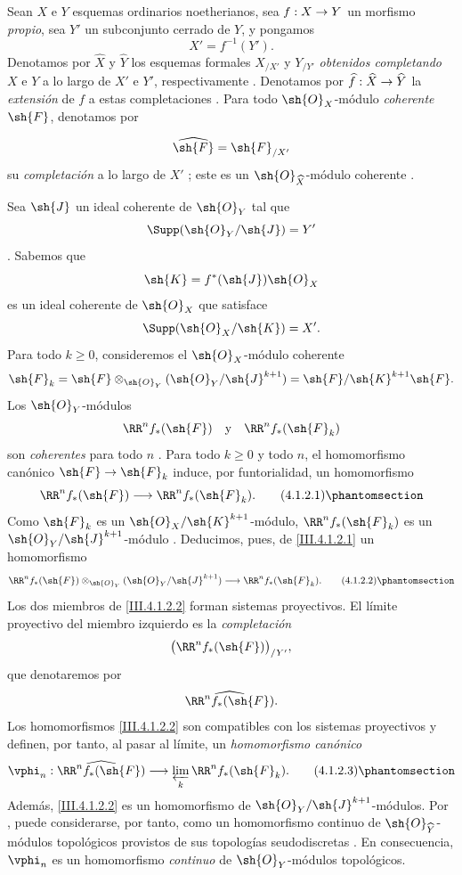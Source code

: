\documentclass[oneside]{amsart}
\makeatletter
\renewcommand{\geq}{\geqslant}
\newcommand{\ega@arrow}[2]{\mathchoice{#1}{#2}{#2}{#2}}
\renewcommand{\to}{\ega@arrow{\longrightarrow}{\rightarrow}}
\newcommand{\oldpage}[2][]{{\marginnote{\normalfont\textbf{#1}~|~#2}}\ignorespaces}
\let\EGAOriginalLabel\label
\renewcommand{\label}[1]{\phantomsection\EGAOriginalLabel{#1}}
\makeatother
\begin{document}
\begin{env}[4.1.1]
\label{III.4.1.1}
Sean $X$ e $Y$ esquemas ordinarios noetherianos, sea $f:X\to Y$ un
morfismo \emph{propio}, sea $Y'$ un subconjunto cerrado de $Y$, y pongamos
\[
  X'=f^{-1}(Y').
\]
Denotamos por $\widehat{X}$ y $\widehat{Y}$ los esquemas formales
$X_{/X'}$ y $Y_{/Y'}$ \emph{obtenidos completando} $X$ e $Y$ a lo largo de
$X'$ e $Y'$, respectivamente .
Denotamos por $\widehat{f}:\widehat{X}\to\widehat{Y}$ la \emph{extensión} de
$f$ a estas completaciones .
Para todo $\sh{O}_X$-módulo \emph{coherente} $\sh{F}$, denotamos por

\oldpage[III]{123}

\[
  \widehat{\sh{F}}=\sh{F}_{/X'}
\]
su \emph{completación} a lo largo de $X'$ ; este es un
$\sh{O}_{\widehat{X}}$-módulo coherente .
\end{env}

\begin{env}[4.1.2]
\label{III.4.1.2}
Sea $\sh{J}$ un ideal coherente de $\sh{O}_Y$ tal que
\[
  \Supp(\sh{O}_Y/\sh{J})=Y'
\]
.
Sabemos  que
\[
  \sh{K}=f^*(\sh{J})\sh{O}_X
\]
es un ideal coherente de $\sh{O}_X$ que satisface
\[
  \Supp(\sh{O}_X/\sh{K})=X'.
\]
Para todo $k\geq0$, consideremos el $\sh{O}_X$-módulo coherente
\[
  \sh{F}_k
  =
  \sh{F}\otimes_{\sh{O}_Y}(\sh{O}_Y/\sh{J}^{k+1})
  =
  \sh{F}/\sh{K}^{k+1}\sh{F}.
\]
Los $\sh{O}_Y$-módulos
\[
  \RR^n f_*(\sh{F})
  \quad\text{y}\quad
  \RR^n f_*(\sh{F}_k)
\]
son \emph{coherentes} para todo $n$ .
Para todo $k\geq0$ y todo $n$, el homomorfismo canónico
$\sh{F}\to\sh{F}_k$ induce, por funtorialidad, un homomorfismo
\[
  \RR^n f_*(\sh{F})
  \longrightarrow
  \RR^n f_*(\sh{F}_k).
  \tag{4.1.2.1}
  \label{III.4.1.2.1}
\]
Como $\sh{F}_k$ es un $\sh{O}_X/\sh{K}^{k+1}$-módulo,
$\RR^n f_*(\sh{F}_k)$ es un
$\sh{O}_Y/\sh{J}^{k+1}$-módulo .
Deducimos, pues, de \eqref{III.4.1.2.1} un homomorfismo
\[
  \RR^n f_*(\sh{F})
  \otimes_{\sh{O}_Y}(\sh{O}_Y/\sh{J}^{k+1})
  \longrightarrow
  \RR^n f_*(\sh{F}_k).
  \tag{4.1.2.2}
  \label{III.4.1.2.2}
\]
Los dos miembros de \eqref{III.4.1.2.2} forman sistemas proyectivos.
El límite proyectivo del miembro izquierdo es la \emph{completación}
\[
  \bigl(\RR^n f_*(\sh{F})\bigr)_{/Y'},
\]
que denotaremos por
\[
  \widehat{\RR^n f_*(\sh{F})}.
\]
Los homomorfismos \eqref{III.4.1.2.2} son compatibles con los sistemas
proyectivos y definen, por tanto, al pasar al límite, un \emph{homomorfismo
canónico}
\[
  \vphi_n:
  \widehat{\RR^n f_*(\sh{F})}
  \longrightarrow
  \varprojlim_k\RR^n f_*(\sh{F}_k).
  \tag{4.1.2.3}
  \label{III.4.1.2.3}
\]
Además, \eqref{III.4.1.2.2} es un homomorfismo de
$\sh{O}_Y/\sh{J}^{k+1}$-módulos.
Por , puede considerarse, por tanto, como un
homomorfismo continuo de $\sh{O}_{\widehat{Y}}$-módulos topológicos
provistos de sus topologías seudodiscretas .
En consecuencia, $\vphi_n$ es un homomorfismo \emph{continuo} de
$\sh{O}_Y$-módulos topológicos.
\end{env}
\end{document}
